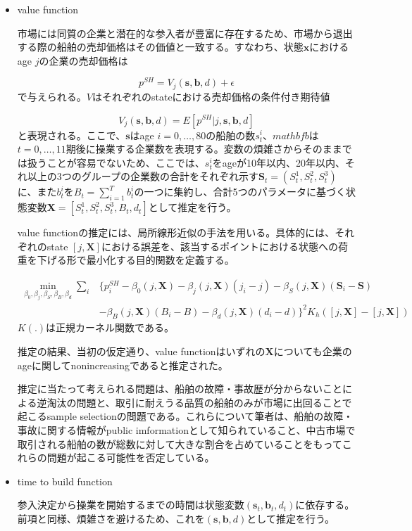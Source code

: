 \documentclass[11pt]{jsarticle}
\begin{document}
\begin{itemize}
  \item value function

  市場には同質の企業と潜在的な参入者が豊富に存在するため、市場から退出する際の船舶の売却価格はその価値と一致する。すなわち、状態$\mathbf{x}$におけるage $j$の企業の売却価格は

  \[
  p^{SH} = V_j(\mathbf{s}, \mathbf{b}, d) + \epsilon
  \]
  で与えられる。$V$はそれぞれのstateにおける売却価格の条件付き期待値

  \[
  V_j(\mathbf{s}, \mathbf{b}, d) = E[p^{SH} | j, \mathbf{s}, \mathbf{b}, d]
  \]
  と表現される。ここで、$\mathbf{s}$はage $i = 0, \ldots, 80$の船舶の数$s_t^i$、$mathbf{b}$は$t=0, \ldots, 11$期後に操業する企業数を表現する。変数の煩雑さからそのままでは扱うことが容易でないため、ここでは、$s_t^i$をageが10年以内、20年以内、それ以上の3つのグループの企業数の合計をそれぞれ示す$\mathbf{S}_t = (S_t^1, S_t^2, S_t^3)$に、また$b_t^i$を$B_t = \sum_{i=1}^T b_t^i$の一つに集約し、合計5つのパラメータに基づく状態変数$\mathbf{X} = [S_t^1, S_t^2, S_t^3, B_t, d_t]$として推定を行う。

  value functionの推定には、局所線形近似の手法を用いる。具体的には、それぞれのstate $[j, \mathbf{X}]$における誤差を、該当するポイントにおける状態への荷重を下げる形で最小化する目的関数を定義する。

  \begin{align*}
    \min_{\beta_0, \beta_j, \beta_S, \beta_B, \beta_d} \sum_i & \{p^{SH}_i -\beta_0(j, \mathbf{X}) - \beta_j (j, \mathbf{X})(j_i - j) - \beta_S(j, \mathbf{X})(\mathbf{S}_i - \mathbf{S}) \\
    & - \beta_B (j, \mathbf{X})(B_i - B) - \beta_d (j, \mathbf{X})(d_i - d) \}^2 K_h ([j, \mathbf{X}] - [j, \mathbf{X}])
  \end{align*}
  $K(.)$は正規カーネル関数である。

  推定の結果、当初の仮定通り、value functionはいずれの$\mathbf{X}$についても企業のageに関してnonincreasingであると推定された。

  推定に当たって考えられる問題は、船舶の故障・事故歴が分からないことによる逆淘汰の問題と、取引に耐えうる品質の船舶のみが市場に出回ることで起こるsample selectionの問題である。これらについて筆者は、船舶の故障・事故に関する情報がpublic imformationとして知られていること、中古市場で取引される船舶の数が総数に対して大きな割合を占めていることをもってこれらの問題が起こる可能性を否定している。

  \item time to build function

  参入決定から操業を開始するまでの時間は状態変数$(\mathbf{s}_t, \mathbf{b}_t, d_t)$に依存する。前項と同様、煩雑さを避けるため、これを$(\mathbf{s}, \mathbf{b}, d)$として推定を行う。


\end{itemize}
\end{document}
